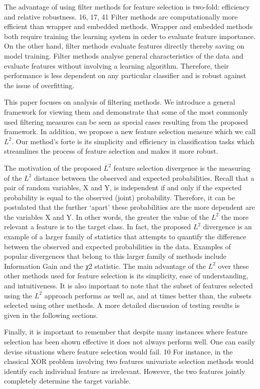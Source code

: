 \documentclass[review]{elsarticle}
\begin{document}
The advantage of using filter methods for feature selection is two-fold: efficiency and relative robustness. 16, 17, 41   Filter methods are computationally more efficient than wrapper and embedded methods. Wrapper and embedded methods both require training the learning system in order to evaluate feature importance. On the other hand, filter methods evaluate features directly thereby saving on model training. Filter methods analyse general characteristics of the data and evaluate features without involving a learning algorithm. Therefore, their performance is less dependent on any particular classifier and is robust against the issue of overfitting. 

This paper focuses on analysis of filtering methods. We introduce a general framework for viewing them and demonstrate that some of the most commonly used filtering measures can be seen as special cases resulting from the proposed framework. In addition, we propose a new feature selection measure which we call $ L^2 $. Our method’s forte is its simplicity and efficiency in classification tasks which streamlines the process of feature selection and makes it more robust. 

The motivation of the proposed $ L^2 $ feature selection divergence is the measuring of the $ L^2 $ distance between the observed and expected probabilities. Recall that a pair of random variables, X and Y, is independent if and only if the expected probability is equal to the observed (joint) probability. Therefore, it can be postulated that the further ‘apart’ these probabilities are the more dependent are the variables X and Y. In other words, the greater the value of the $ L^2 $ the more relevant a feature is to the target class. In fact, the proposed $ L^2 $ divergence is an example of a larger family of statistics that attempts to quantify the difference between the observed and expected probabilities in the data. Examples of popular divergences that belong to this larger family of methods include Information Gain and the χ2 statistic. The main advantage of the $ L^2 $ over these other methods used for feature selection is its simplicity, ease of understanding, and intuitiveness. It is also important to note that the subset of features selected using the $ L^2 $ approach performs as well as, and at times better than, the subsets selected using other methods. A more detailed discussion of testing results is given in the following sections. 

Finally, it is important to remember that despite many instances where feature selection has been shown effective it does not always perform well. One can easily devise situations where feature selection would fail. 10  For instance, in the classical XOR problem involving two features univariate selection methods would identify each individual feature as irrelevant. However, the two features jointly completely determine the target variable. 
\end{document}
